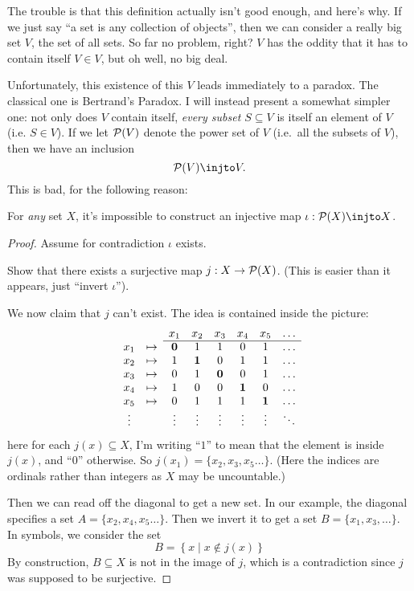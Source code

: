 The trouble is that this definition actually isn't good enough, and here's why.
If we just say ``a set is any collection of objects'',
then we can consider a really big set $V$, the set of all sets.
So far no problem, right?
$V$ has the oddity that it has to contain itself $V \in V$,
but oh well, no big deal.

Unfortunately, this existence of this $V$ leads immediately to a paradox.
The classical one is Bertrand's Paradox.
I will instead present a somewhat simpler one:
not only does $V$ contain itself, \emph{every subset $S \subseteq V$}
is itself an element of $V$ (i.e. $S \in V$).
If we let $\mathcal P(V)$ denote the power set of $V$
(i.e.\ all the subsets of $V$), then we have an inclusion
\[ \PP(V) \injto V. \]
This is bad, for the following reason:
\begin{lemma}
	\label{lem:cantor_diag}
	For \emph{any} set $X$, it's impossible to construct an injective
	map $\iota : \PP(X) \injto X$.
\end{lemma}
\begin{proof}
	Assume for contradiction $\iota$ exists.
	\begin{exercise}
		Show that there exists a surjective map $j : X \to \mathcal P(X)$.
		(This is easier than it appears, just ``invert $\iota$'').
	\end{exercise}
	We now claim that $j$ can't exist.
	The idea is contained inside the picture:
	\[
		\begin{array}{cccccccc}
			&& x_1 & x_2 & x_3 & x_4 & x_5 & \dots \\ \cline{3-8}
			x_1 & \mapsto & \mathbf0 & 1 & 1 & 0 & 1 & \dots \\
			x_2 & \mapsto & 1 & \mathbf1 & 0 & 1 & 1 & \dots \\
			x_3 & \mapsto & 0 & 1 & \mathbf0 & 0 & 1 & \dots \\
			x_4 & \mapsto & 1 & 0 & 0 & \mathbf1 & 0 & \dots \\
			x_5 & \mapsto & 0 & 1 & 1 & 1 & \mathbf1 & \dots \\
			\vdots && \vdots & \vdots & \vdots & \vdots & \vdots & \ddots
		\end{array}
	\]
	here for each $j(x) \subseteq X$, I'm writing ``$1$'' to mean that
	the element is inside $j(x)$, and ``$0$'' otherwise.
	So $j(x_1) = \{x_2, x_3, x_5 \dots\}$.
	(Here the indices are ordinals rather than integers
	as $X$ may be uncountable.)

	Then we can read off the diagonal to get a new set.
	In our example, the diagonal specifies a set
	$A = \{x_2, x_4, x_5 \dots\}$.
	Then we invert it to get a set $B = \{x_1, x_3, \dots\}$.
	In symbols, we consider the set
	\[ B = \left\{ x \mid x \notin j(x) \right\} \]
	By construction, $B \subseteq X$ is not in the image of $j$,
	which is a contradiction since $j$ was supposed to be surjective.
\end{proof}


